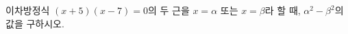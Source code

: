 이차방정식 $(x+5)(x-7)=0$의 두 근을 $x=\alpha$ 또는 $x=\beta$라 할 때, $\alpha^2-\beta^2$의 값을 구하시오. \cond{$\alpha>\beta$}
